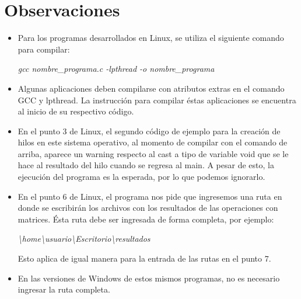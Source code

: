 \documentclass[12pt]{article}
\begin{document}
\newpage
	\section{Observaciones}
        
        \begin{itemize}
            \item[\Checkmark] Para los programas desarrollados en Linux, se utiliza el siguiente comando para compilar:
            
            \textit{gcc nombre\_programa.c -lpthread -o nombre\_programa}
            
            \item[\Checkmark] Algunas aplicaciones deben compilarse con atributos extras en el comando GCC y lpthread. La instrucción para compilar éstas aplicaciones se encuentra al inicio de su respectivo código.
            
            \item[\Checkmark] En el punto 3 de Linux, el segundo código de ejemplo para la creación de hilos en este sistema operativo, al momento de compilar con el comando de arriba, aparece un warning respecto al cast a tipo de variable void que se le hace al resultado del hilo cuando se regresa al main. A pesar de esto, la ejecución del programa es la esperada, por lo que podemos ignorarlo.
            
            \item[\Checkmark] En el punto 6 de Linux, el programa nos pide que ingresemos una ruta en donde se escribirán los archivos con los resultados de las operaciones con matrices. Ésta ruta debe ser ingresada de forma completa, por ejemplo: 
            
            \textit{\textbackslash home\textbackslash usuario\textbackslash Escritorio\textbackslash resultados}
            
            Esto aplica de igual manera para la entrada de las rutas en el punto 7.
            
            \item[\Checkmark] En las versiones de Windows de estos mismos programas, no es necesario ingresar la ruta completa.
            

\end{itemize}
\end{document}
